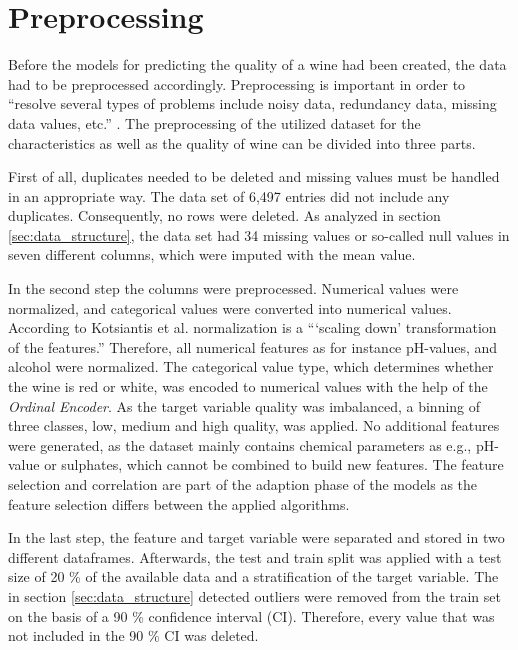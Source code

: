 \section{Preprocessing}\label{chap:preprocessing}
Before the models for predicting the quality of a wine had been created, the data had to be preprocessed accordingly. Preprocessing is important in order to \enquote{resolve several types of problems include noisy data, redundancy data, missing data values, etc.} \citep[p. 116]{Kotsiantis2006}. The preprocessing of the utilized dataset for the characteristics as well as the quality of wine can be divided into three parts.

First of all, duplicates needed to be deleted and missing values must be handled in an appropriate way. The data set of 6,497 entries did not include any duplicates. Consequently, no rows were deleted. As analyzed in section \ref{sec:data_structure}, the data set had 34 missing values or so-called null values in seven different columns, which were imputed with the mean value.

In the second step the columns were preprocessed. Numerical values were normalized, and categorical values were converted into numerical values. According to Kotsiantis et al. normalization is a \enquote{\enquote{scaling down} transformation of the features.} \citep[p. 113]{Kotsiantis2006} Therefore, all numerical features as for instance pH-values, and alcohol were normalized. The categorical value type, which determines whether the wine is red or white, was encoded to numerical values with the help of the \textit{Ordinal Encoder}. \citep{OrdinalEncoder2021} As the target variable quality was imbalanced, a binning of three classes, low, medium and high quality, was applied. No additional features were generated, as the dataset mainly contains chemical parameters as e.g., pH-value or sulphates, which cannot be combined to build new features. The feature selection and correlation are part of the adaption phase of the models as the feature selection differs between the applied algorithms.

In the last step, the feature and target variable were separated and stored in two different dataframes. Afterwards, the test and train split was applied with a test size of 20 \% of the available data and a stratification of the target variable. The in section \ref{sec:data_structure} detected outliers were removed from the train set on the basis of a 90 \% confidence interval (CI). \citep{AskPython2021} Therefore, every value that was not included in the 90 \% CI was deleted.



